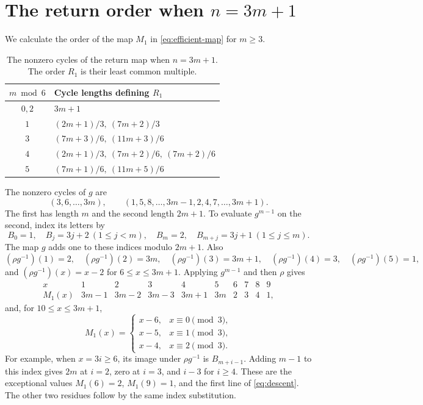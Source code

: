 \section{The return order when \texorpdfstring{$n=3m+1$}{n=3m+1}}\label{app:cycles}

We calculate the order of the map $M_1$ in \eqref{eq:efficient-map} for $m\ge3$.
\begin{table}[htbp]
\centering
\renewcommand{\arraystretch}{1.3}
\begin{tabular}{c l}
\toprule
$m\bmod6$ & Cycle lengths defining $R_1$\\
\midrule
$0,2$ & $3m+1$\\
$1$ & $(2m+1)/3,\ (7m+2)/3$\\
$3$ & $(7m+3)/6,\ (11m+3)/6$\\
$4$ & $(2m+1)/3,\ (7m+2)/6,\ (7m+2)/6$\\
$5$ & $(7m+1)/6,\ (11m+5)/6$\\
\bottomrule
\end{tabular}
\caption{The nonzero cycles of the return map when $n=3m+1$.
The order $R_1$ is their least common multiple.}
\label{tab:cycles}
\end{table}

The nonzero cycles of $g$ are
\[
 (3,6,\ldots,3m),\qquad
 (1,5,8,\ldots,3m-1,2,4,7,\ldots,3m+1).
\]
The first has length $m$ and the second length $2m+1$. To evaluate
$g^{m-1}$ on the second, index its letters by
\[
 B_0=1,\quad B_j=3j+2\ (1\le j<m),\quad B_m=2,\quad
 B_{m+j}=3j+1\ (1\le j\le m).
\]
The map $g$ adds one to these indices modulo $2m+1$. Also
\[
 (\rho g^{-1})(1)=2,\quad
 (\rho g^{-1})(2)=3m,\quad
 (\rho g^{-1})(3)=3m+1,\quad
 (\rho g^{-1})(4)=3,\quad
 (\rho g^{-1})(5)=1,
\]
and $(\rho g^{-1})(x)=x-2$ for $6\le x\le3m+1$.
Applying $g^{m-1}$ and then $\rho$ gives
\[
\begin{array}{c|rrrrrrrrr}
x&1&2&3&4&5&6&7&8&9\\\hline
M_1(x)&3m-1&3m-2&3m-3&3m+1&3m&2&3&4&1,
\end{array}
\]
and, for $10\le x\le3m+1$,
\begin{equation}\label{eq:descent}
 M_1(x)=\begin{cases}
 x-6,&x\equiv0\pmod3,\\
 x-5,&x\equiv1\pmod3,\\
 x-4,&x\equiv2\pmod3.
 \end{cases}
\end{equation}
For example, when $x=3i\ge6$, its image under $\rho g^{-1}$ is
$B_{m+i-1}$. Adding $m-1$ to this index gives $2m$ at $i=2$, zero
at $i=3$, and $i-3$ for $i\ge4$. These are the exceptional values
$M_1(6)=2$, $M_1(9)=1$, and the first line of \eqref{eq:descent}.
The other two residues follow by the same index substitution.

